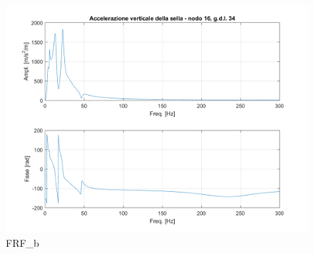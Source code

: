 \documentclass[12pt, a4paper]{article}
\begin{document}
	\begin{figure}[h]
		\centering
		\includegraphics[scale=0.8]{FRF_5b}
		\caption{FRF\_b}
	\end{figure}
	
	\clearpage
\end{document}
